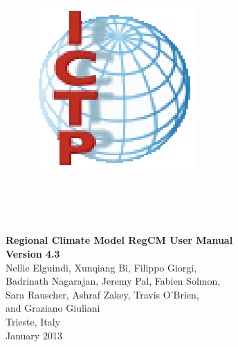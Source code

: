 \documentclass[10pt,twoside,a4paper]{report}
\begin{document}
\begin{titlepage}

\begin{figure}
\vspace{-35pt}
\begin{center}
\includegraphics{ICTP_logo}
\end{center}
\end{figure}

\\
 \\
 \\

\vspace{3cm}

\begin{boxedminipage}{\textwidth}
\begin{center}
\vspace{0.5cm}
{\Large
{\bf Regional Climate Model RegCM User Manual} \\
\vspace{0.2cm}
{\bf Version 4.3}}\\
\vspace{0.5cm}
Nellie Elguindi, Xunqiang Bi, Filippo Giorgi,\\
Badrinath Nagarajan, Jeremy Pal, Fabien Solmon,\\
Sara Rauscher, Ashraf Zakey, Travis O'Brien,\\
and Graziano Giuliani\\
Trieste, Italy\\January 2013
\vspace{0.5cm}
\end{center}
\end{boxedminipage}

\end{titlepage}

\cleardoublepage

\cleardoublepage
\tableofcontents
\cleardoublepage

\listoffigures
\listoftables
\cleardoublepage













\end{document}
